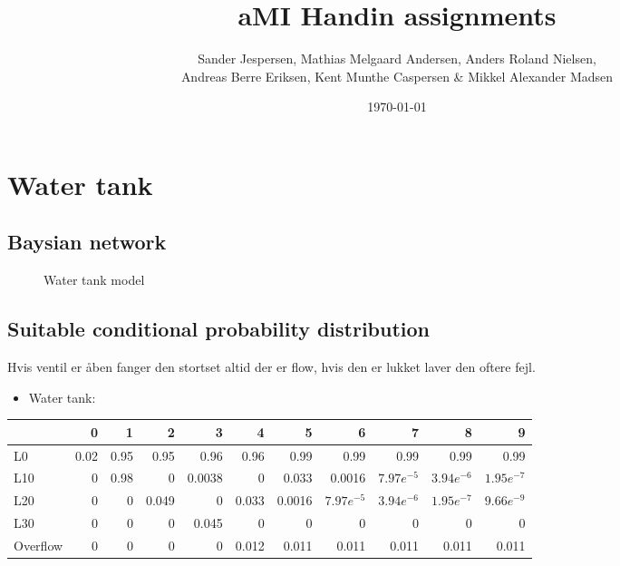 \documentclass[colorlinks=true,linkcolor=blue]{article}
\author{Sander Jespersen, Mathias Melgaard Andersen, Anders Roland Nielsen, \\ Andreas Berre Eriksen, Kent Munthe Caspersen \& Mikkel Alexander Madsen}
\date{\today}
\title{aMI Handin assignments}
\begin{document}
\maketitle

\section{Water tank}
\label{sec-1}
\subsection{Baysian network}
\label{sec-1-1}
\begin{figure}[!htb]
  \centering
  \caption{Water tank model}
  \label{fig:A1}
\end{figure}

\subsection{Suitable conditional probability distribution}
\label{sec-1-2}
Hvis ventil er åben fanger den stortset altid der er flow, hvis den er lukket laver den oftere fejl.

\begin{itemize}
\item Water tank:
\end{itemize}
\begin{center}
\begin{tabular}{l|rrrrrrrrrr|}
 & 0 & 1 & 2 & 3 & 4 & 5 & 6 & 7 & 8 & 9\\
\hline
L0 & 0.02 & 0.95 & 0.95 & 0.96 & 0.96 & 0.99 & 0.99 & 0.99 & 0.99 & 0.99\\
L10 & 0 & 0.98 & 0 & 0.0038 & 0 & 0.033 & 0.0016 & $7.97e^{-5}$ & $3.94e^{-6}$ & $1.95e^{-7}$\\
L20 & 0 & 0 & 0.049 & 0 & 0.033 & 0.0016 & $7.97e^{-5}$ & $3.94e^{-6}$ & $1.95e^{-7}$ & $9.66e^{-9}$\\
L30 & 0 & 0 & 0 & 0.045 & 0 & 0 & 0 & 0 & 0 & 0\\
Overflow & 0 & 0 & 0 & 0 & 0.012 & 0.011 & 0.011 & 0.011 & 0.011 & 0.011\\
\end{tabular}
\end{center}
\end{document}
